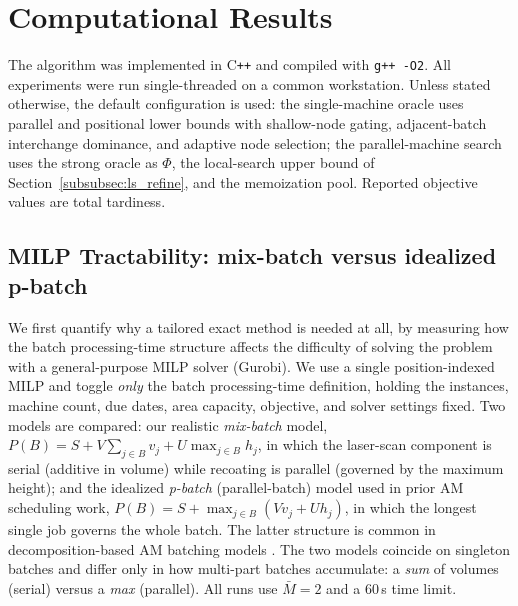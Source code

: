\documentclass[review,3p,times,authoryear]{elsarticle}
\begin{document}
\section{Computational Results}
\label{sec:results}

The algorithm was implemented in C\texttt{++} and compiled with \texttt{g++ -O2}.
All experiments were run single-threaded on a common workstation. Unless stated
otherwise, the default configuration is used: the single-machine oracle uses
parallel and positional lower bounds with shallow-node gating, adjacent-batch
interchange dominance, and adaptive node selection; the parallel-machine search
uses the strong oracle as $\Phi$, the local-search upper bound of
Section~\ref{subsubsec:ls_refine}, and the memoization pool. Reported objective
values are total tardiness.

\subsection{MILP Tractability: mix-batch versus idealized p-batch}
\label{subsec:res_milp}

We first quantify why a tailored exact method is needed at all, by measuring how
the batch processing-time structure affects the difficulty of solving the problem
with a general-purpose MILP solver (Gurobi). We use a single position-indexed
MILP and toggle \emph{only} the batch processing-time definition, holding the
instances, machine count, due dates, area capacity, objective, and solver
settings fixed. Two models are compared: our realistic \emph{mix-batch} model,
$P(B)=S+V\sum_{j\in B}v_j+U\max_{j\in B}h_j$, in which the laser-scan component is
serial (additive in volume) while recoating is parallel (governed by the maximum
height); and the idealized \emph{p-batch} (parallel-batch) model used in prior AM
scheduling work, $P(B)=S+\max_{j\in B}(V v_j+U h_j)$, in which the longest single
job governs the whole batch.
The latter structure is common in decomposition-based AM batching models
\citep{nascimentoOptimalDecompositionApproach2024,
nascimentoImprovingEfficiencyLogicbased2026}.
The two models coincide on singleton batches and differ only in how multi-part
batches accumulate: a \emph{sum} of volumes (serial) versus a \emph{max}
(parallel). All runs use $\bar M=2$ and a $60$\,s time limit.
\end{document}
